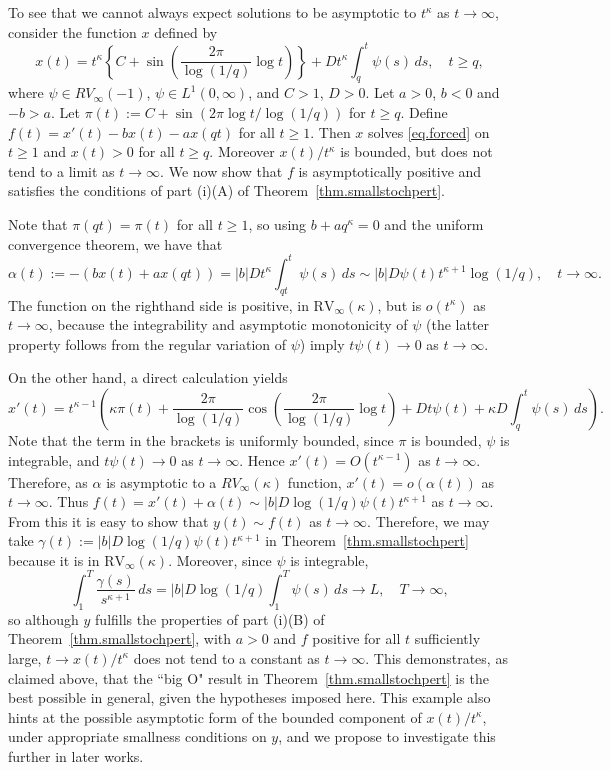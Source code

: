\documentclass[a4paper,10pt,reqno]{amsart}
\numberwithin{equation}{section}
\theoremstyle{definition}
\theoremstyle{remark}
\DeclareMathOperator{\1}{\mathbbm 1}
\begin{document}
To see that we cannot always expect solutions to be asymptotic to $t^\kappa$ as $t\to\infty$, consider the function $x$ defined by  
\[
x(t)=t^\kappa\left\{C+\sin\left(\frac{2\pi}{\log(1/q)}\log t\right)\right\}+Dt^\kappa\int_q^t \psi(s)\,ds, \quad t\geq q,
\]  
where $\psi\in RV_\infty(-1)$, $\psi\in L^1(0,\infty)$, and $C>1$, $D>0$. Let $a>0$, $b<0$ and $-b>a$. Let $\pi(t):=C+\sin(2\pi\log t/\log(1/q))$ for $t\geq q$. Define $f(t)=x'(t)-bx(t)-ax(qt)$ for all $t\geq 1$. Then $x$ solves \eqref{eq.forced} on $t\geq 1$ and $x(t)>0$ for all $t\geq q$. Moreover $x(t)/t^\kappa$ is bounded, but does not tend to a limit as $t\to\infty$. We now show that $f$ is asymptotically positive and satisfies the conditions of part (i)(A) of Theorem~\ref{thm.smallstochpert}. 

Note that $\pi(qt)=\pi(t)$ for all $t\geq 1$, so using $b+aq^\kappa=0$ and the uniform convergence theorem, we have that 
\[
\alpha(t):=-(bx(t)+ax(qt))=|b|Dt^\kappa\int_{qt}^t \psi(s)\,ds\sim |b|D\psi(t)t^{\kappa+1}\log(1/q),\quad t\to\infty.
\]
The function on the righthand side is positive, in $\text{RV}_\infty(\kappa)$, but is $o(t^\kappa)$ as
$t\to\infty$, because the integrability and asymptotic monotonicity of $\psi$ (the latter property follows from the regular variation of $\psi$) imply $t\psi(t)\to 0$ as $t\to\infty$. 

On the other hand, a direct calculation yields
\[
x'(t)=t^{\kappa-1} \left(\kappa\pi(t)+ \frac{2\pi}{\log(1/q)}\cos\left(\frac{2\pi}{\log(1/q)}\log t\right)
+D t\psi(t)+\kappa D \int_q^t \psi(s)\,ds\right).
\]
Note that the term in the brackets is uniformly bounded, since $\pi$ is bounded, $\psi$ is integrable, and $t\psi(t)\to 0$ as $t\to\infty$. Hence $x'(t)=O(t^{\kappa-1})$ as $t\to\infty$. Therefore, as $\alpha$ is asymptotic to a $RV_\infty(\kappa)$ function, $x'(t)=o(\alpha(t))$ as $t\to\infty$. Thus $f(t)=x'(t)+\alpha(t)\sim |b|D\log(1/q)\psi(t) t^{\kappa+1}$ as $t\to\infty$. From this it is easy to show that $y(t)\sim f(t)$ as $t\to\infty$. Therefore, we may take $\gamma(t):=|b|D\log(1/q)\psi(t) t^{\kappa+1}$ in Theorem~\ref{thm.smallstochpert} because it is in $\text{RV}_\infty(\kappa)$. Moreover, since $\psi$ is integrable, 
\[
\int_1^T \frac{\gamma(s)}{s^{\kappa+1}}\,ds
=|b|D\log(1/q)\int_1^T \psi(s)\,ds\to L, \quad T\to\infty,
\]
so although $y$ fulfills the properties of part (i)(B) of  Theorem~\ref{thm.smallstochpert}, with $a>0$ and $f$ positive for all $t$ sufficiently large, $t\to x(t)/t^\kappa$ does not tend to a constant as $t\to\infty$. This demonstrates, as claimed above, that the ``big O" result in Theorem~\ref{thm.smallstochpert} is the best possible in general, given the hypotheses imposed here. This example also hints at the possible asymptotic form of the bounded component of $x(t)/t^\kappa$, under appropriate smallness conditions on $y$, and we propose to investigate this further in later works.   
\end{document}
